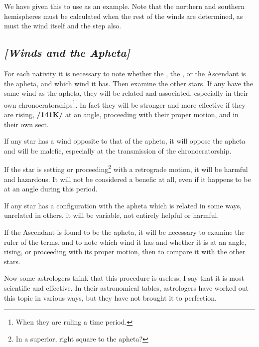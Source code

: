 We have given this to use as an example. Note that the northern and southern hemispheres must be calculated when the rest of the winds are determined, as must the wind itself and the step also.

\subsection{\textit{[Winds and the Apheta]}}
For each nativity it is necessary to note whether the \Sun, the \Moon, or the Ascendant is the apheta, and which wind it has. Then examine the other stars. If any have the same wind as the apheta, they will be related and associated, especially in their own chronocratorships\footnote{When they are ruling a time period.}. \mndl In fact they will be stronger and more effective if they are rising, \textbf{/141K/} at an angle, proceeding with their proper motion, and in their own sect.

If any star has a wind opposite to that of the apheta, it will oppose the apheta and will be malefic, especially at the transmission of the chronocratorship. 

If the star is setting or proceeding\footnote{In a superior, right square to the apheta?} with a retrograde motion, it will be harmful and hazardous. It will not be considered a benefic at all, even if it happens to be
at an angle during this period. 

If any star has a configuration with the apheta which is related in some ways, unrelated in others, it will be variable, not entirely helpful or harmful. 

If the Ascendant is found to be the apheta, it will be necessary to examine the ruler of the terms, and to note which wind it has and whether it is at an angle, rising, or proceeding with its proper motion, then to compare it with the other stars.

Now some astrologers think that this procedure is useless; I say that it is most scientific and effective. In their astronomical tables, astrologers have worked out this topic in various ways, but they have not brought it to perfection.

\newpage
